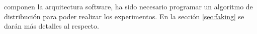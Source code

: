 \documentclass[fontsize=11pt, English=false, Español=true, Myfinal=true, twoside, numbers=noenddot]{scrbook}
\begin{document}
componen la arquitectura software, ha sido necesario programar un algoritmo de distribución para poder realizar los experimentos. En la sección \ref{sec:faking} se darán más detalles al respecto.

\end{document}
